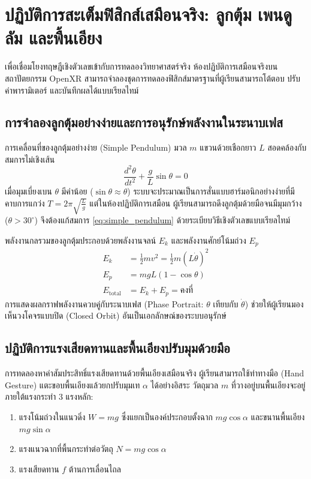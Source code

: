 \section{ปฏิบัติการสะเต็มฟิสิกส์เสมือนจริง: ลูกตุ้ม เพนดูลัม และพื้นเอียง}

เพื่อเชื่อมโยงทฤษฎีเชิงตัวเลขเข้ากับการทดลองวิทยาศาสตร์จริง ห้องปฏิบัติการเสมือนจริงบนสถาปัตยกรรม OpenXR สามารถจำลองชุดการทดลองฟิสิกส์มาตรฐานที่ผู้เรียนสามารถโต้ตอบ ปรับค่าพารามิเตอร์ และบันทึกผลได้แบบเรียลไทม์

\subsection{การจำลองลูกตุ้มอย่างง่ายและการอนุรักษ์พลังงานในระนาบเฟส}

การเคลื่อนที่ของลูกตุ้มอย่างง่าย (Simple Pendulum) มวล $m$ แขวนด้วยเชือกยาว $L$ สอดคล้องกับสมการไม่เชิงเส้น
\begin{equation}
\frac{d^2\theta}{dt^2} + \frac{g}{L}\sin\theta = 0 \label{eq:simple_pendulum}
\end{equation}
เมื่อมุมเบี่ยงเบน $\theta$ มีค่าน้อย ($\sin\theta \approx \theta$) ระบบจะประมาณเป็นการสั่นแบบฮาร์มอนิกอย่างง่ายที่มีคาบการแกว่ง $T = 2\pi\sqrt{\frac{L}{g}}$ แต่ในห้องปฏิบัติการเสมือน ผู้เรียนสามารถดึงลูกตุ้มด้วยมือจนมีมุมกว้าง ($\theta > 30^\circ$) จึงต้องแก้สมการ \eqref{eq:simple_pendulum} ด้วยระเบียบวิธีเชิงตัวเลขแบบเรียลไทม์

พลังงานกลรวมของลูกตุ้มประกอบด้วยพลังงานจลน์ $E_k$ และพลังงานศักย์โน้มถ่วง $E_p$
\begin{align}
E_k &= \frac{1}{2} m v^2 = \frac{1}{2} m (L\dot{\theta})^2 \label{eq:pendulum_ek} \\
E_p &= mgL(1 - \cos\theta) \label{eq:pendulum_ep} \\
E_{\text{total}} &= E_k + E_p = \text{คงที่} \label{eq:pendulum_etotal}
\end{align}
การแสดงผลกราฟพลังงานควบคู่กับระนาบเฟส (Phase Portrait: $\theta$ เทียบกับ $\dot{\theta}$) ช่วยให้ผู้เรียนมองเห็นวงโคจรแบบปิด (Closed Orbit) อันเป็นเอกลักษณ์ของระบบอนุรักษ์

\subsection{ปฏิบัติการแรงเสียดทานและพื้นเอียงปรับมุมด้วยมือ}

การทดลองหาค่าสัมประสิทธิ์แรงเสียดทานด้วยพื้นเอียงเสมือนจริง ผู้เรียนสามารถใช้ท่าทางมือ (Hand Gesture) แตะขอบพื้นเอียงแล้วยกปรับมุมเท $\alpha$ ได้อย่างอิสระ วัตถุมวล $m$ ที่วางอยู่บนพื้นเอียงจะอยู่ภายใต้แรงกระทำ 3 แรงหลัก:
\begin{enumerate}
    \item แรงโน้มถ่วงในแนวดิ่ง $W = mg$ ซึ่งแยกเป็นองค์ประกอบตั้งฉาก $mg\cos\alpha$ และขนานพื้นเอียง $mg\sin\alpha$
    \item แรงแนวฉากที่พื้นกระทำต่อวัตถุ $N = mg\cos\alpha$
    \item แรงเสียดทาน $f$ ต้านการเลื่อนไถล
\end{enumerate}

